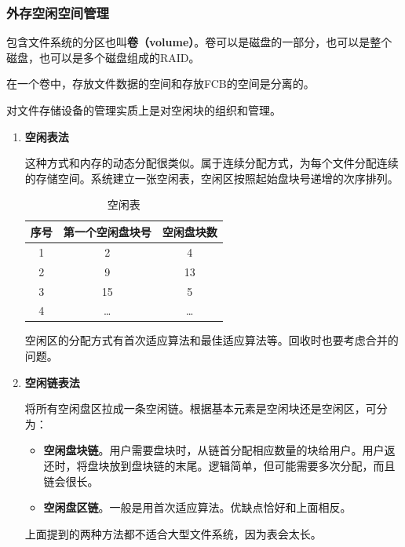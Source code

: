 \documentclass[12pt, a4paper, oneside]{ctexart}
\begin{document}
\subsubsection{外存空闲空间管理}

包含文件系统的分区也叫\textbf{卷（volume）}。卷可以是磁盘的一部分，也可以是整个磁盘，也可以是多个磁盘组成的RAID。

在一个卷中，存放文件数据的空间和存放FCB的空间是分离的。

对文件存储设备的管理实质上是对空闲块的组织和管理。

\begin{enumerate}
  \item {\bf 空闲表法}
  
  这种方式和内存的动态分配很类似。属于连续分配方式，为每个文件分配连续的存储空间。系统建立一张空闲表，空闲区按照起始盘块号递增的次序排列。

  \begin{table}[!ht]
    \centering
    \caption{空闲表}
    \label{idle-table}
    \begin{tabular}{c|c|c}
    \hline
      \textbf{序号} & \textbf{第一个空闲盘块号} & \textbf{空闲盘块数} \\ \hline
      1 & 2 & 4 \\ \hline
      2 & 9 & 13 \\ \hline
      3 & 15 & 5 \\ \hline
      4 & \dots & \dots \\ \hline
    \end{tabular}
  \end{table}

  空闲区的分配方式有首次适应算法和最佳适应算法等。回收时也要考虑合并的问题。

  \item {\bf 空闲链表法}
  
  将所有空闲盘区拉成一条空闲链。根据基本元素是空闲块还是空闲区，可分为：
  \begin{itemize}
    \item {\bf 空闲盘块链}。用户需要盘块时，从链首分配相应数量的块给用户。用户返还时，将盘块放到盘块链的末尾。逻辑简单，但可能需要多次分配，而且链会很长。
    \item {\bf 空闲盘区链}。一般是用首次适应算法。优缺点恰好和上面相反。
  \end{itemize}

  \vspace*{10pt}

  上面提到的两种方法都不适合大型文件系统，因为表会太长。


\end{enumerate}
\end{document}
